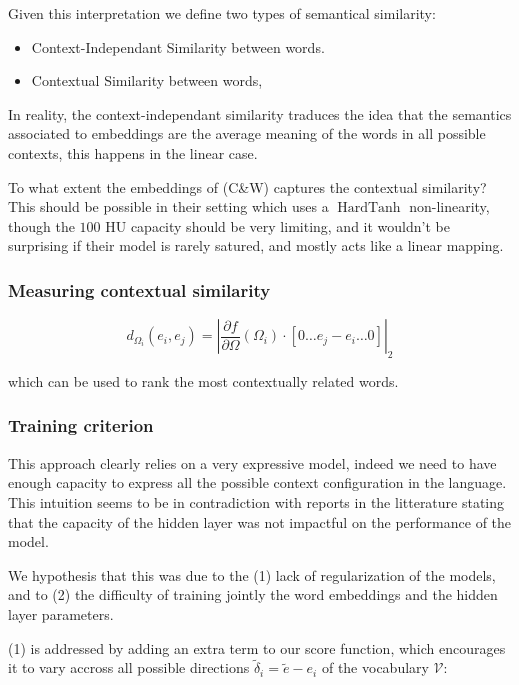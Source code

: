 \documentclass[11pt]{article} %
\begin{document}
Given this interpretation we define two types of semantical
similarity:

\begin{itemize}
\item Context-Independant Similarity between words.
\item Contextual  Similarity between words,
\end{itemize}


In reality, the context-independant similarity traduces the idea that
the semantics associated to embeddings are the average meaning of the
words in all possible contexts, this happens in the linear case.

To what extent the embeddings of (C\&W) captures the contextual
similarity? This should be possible in their setting which uses a
$\operatorname{HardTanh}$ non-linearity, though the $100$ HU capacity
should be very limiting, and it wouldn't be surprising if their model
is rarely satured, and mostly acts like a linear mapping.

\subsubsection{Measuring contextual similarity}
\begin{equation}
d_{\Omega_i}(e_i, e_j) = \left| \frac{\partial f }{\partial \Omega}
\left(\Omega_i\right) \cdot \left[ 0\ldots e_j-e_i \ldots 0\right]
\right|_2
\end{equation}

which can be used to rank the most contextually related words.

\subsubsection{Training criterion}
This approach clearly relies on a very expressive model, indeed we
need to have enough capacity to express all the possible context
configuration in the language. This intuition seems to be in
contradiction with reports in the litterature stating that the
capacity of the hidden layer was not impactful on the performance of
the model.

We hypothesis that this was due to the (1) lack of regularization of
the models, and to (2) the difficulty of training jointly the word
embeddings and the hidden layer parameters.

(1) is addressed by adding an extra term to our score function, which
encourages it to vary accross all possible directions
$\tilde{\delta}_{i} = \tilde{e} - e_i$ of the vocabulary
$\mathcal{V}$:
\end{document}
